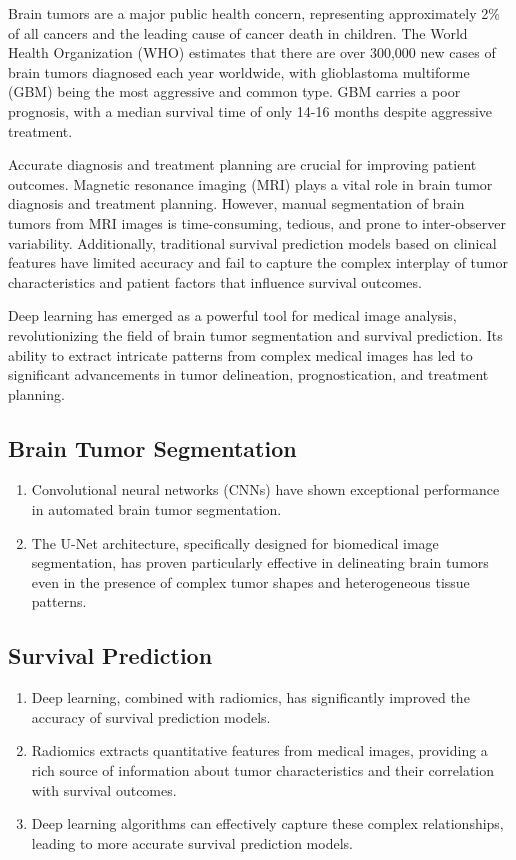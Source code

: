 \documentclass[12pt,oneside]{report}
\begin{document}
Brain tumors are a major public health concern, representing approximately 2\% of all cancers and the leading cause of cancer death in children. The World Health Organization (WHO) estimates that there are over 300,000 new cases of brain tumors diagnosed each year worldwide, with glioblastoma multiforme (GBM) being the most aggressive and common type. GBM carries a poor prognosis, with a median survival time of only 14-16 months despite aggressive treatment.

Accurate diagnosis and treatment planning are crucial for improving patient outcomes. Magnetic resonance imaging (MRI) plays a vital role in brain tumor diagnosis and treatment planning. However, manual segmentation of brain tumors from MRI images is time-consuming, tedious, and prone to inter-observer variability. Additionally, traditional survival prediction models based on clinical features have limited accuracy and fail to capture the complex interplay of tumor characteristics and patient factors that influence survival outcomes.

Deep learning has emerged as a powerful tool for medical image analysis, revolutionizing the field of brain tumor segmentation and survival prediction. Its ability to extract intricate patterns from complex medical images has led to significant advancements in tumor delineation, prognostication, and treatment planning.

\subsection{Brain Tumor Segmentation}
\begin{enumerate}
\item Convolutional neural networks (CNNs) have shown exceptional performance in automated brain tumor segmentation.

\item The U-Net architecture, specifically designed for biomedical image segmentation, has proven particularly effective in delineating brain tumors even in the presence of complex tumor shapes and heterogeneous tissue patterns.

\end{enumerate}

\subsection{Survival Prediction}
\begin{enumerate}
\item Deep learning, combined with radiomics, has significantly improved the accuracy of survival prediction models.

\item Radiomics extracts quantitative features from medical images, providing a rich source of information about tumor characteristics and their correlation with survival outcomes.

\item Deep learning algorithms can effectively capture these complex relationships, leading to more accurate survival prediction models.

\end{enumerate}
\end{document}
